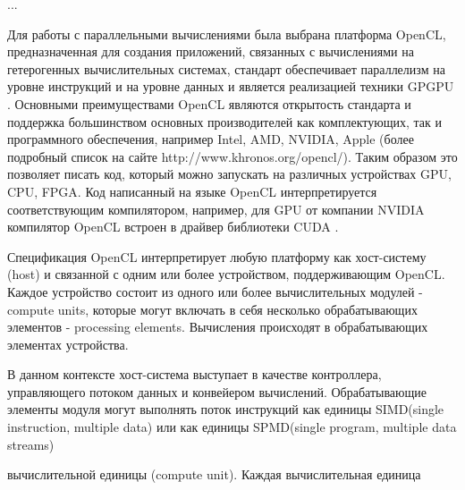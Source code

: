 ...

Для работы с параллельными вычислениями была выбрана платформа OpenCL, предназначенная для создания приложений, связанных с вычислениями на гетерогенных вычислительных системах, стандарт обеспечивает параллелизм на уровне инструкций и на уровне  данных и является реализацией техники GPGPU  \cite{Munshi2011, Stone2010}. Основными  преимуществами OpenCL являются открытость стандарта и поддержка большинством основных производителей как комплектующих, так и программного обеспечения, например Intel, AMD, NVIDIA, Apple (более подробный список на сайте http://www.khronos.org/opencl/). Таким образом это позволяет писать код, который можно запускать на различных устройствах GPU, CPU, FPGA. Код написанный на языке OpenCL интерпретируется соответствующим  компилятором, например, для GPU от компании NVIDIA компилятор OpenCL встроен в драйвер библиотеки CUDA \cite{Cook2012}.

Спецификация OpenCL интерпретирует любую платформу как хост-систему (host) и связанной с одним или более устройством, поддерживающим OpenCL. Каждое устройство состоит из одного или более вычислительных модулей - compute units,  которые  могут  включать  в  себя  несколько обрабатывающих элементов - processing elements. Вычисления  происходят  в обрабатывающих элементах устройства.

В данном контексте хост-система выступает в качестве контроллера, управляющего потоком  данных и конвейером вычислений. Обрабатывающие элементы модуля могут выполнять поток инструкций как единицы SIMD(single instruction, multiple data)\cite{Flynn1972} или как единицы SPMD(single program, multiple data streams)\citep{Darema2011}

вычислительной единицы (compute unit). Каждая вычислительная единица 

